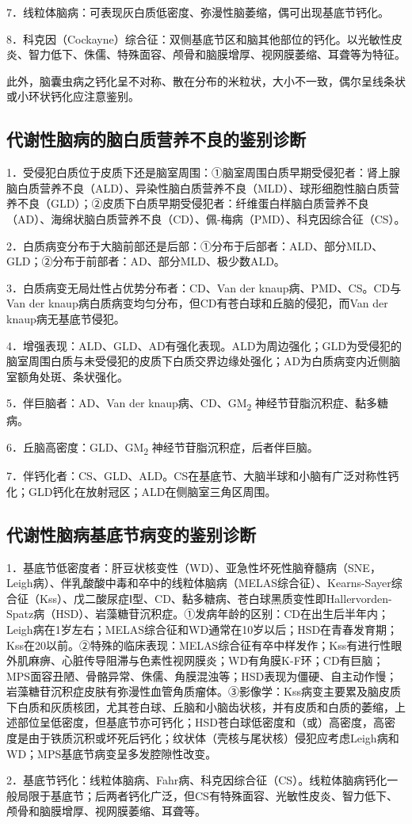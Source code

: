 7．线粒体脑病：可表现灰白质低密度、弥漫性脑萎缩，偶可出现基底节钙化。

8．科克因（Cockayne）综合征：双侧基底节区和脑其他部位的钙化。以光敏性皮炎、智力低下、侏儒、特殊面容、颅骨和脑膜增厚、视网膜萎缩、耳聋等为特征。

此外，脑囊虫病之钙化呈不对称、散在分布的米粒状，大小不一致，偶尔呈线条状或小环状钙化应注意鉴别。

\subsection{代谢性脑病的脑白质营养不良的鉴别诊断}

1．受侵犯白质位于皮质下还是脑室周围：①脑室周围白质早期受侵犯者：肾上腺脑白质营养不良（ALD）、异染性脑白质营养不良（MLD）、球形细胞性脑白质营养不良（GLD）；②皮质下白质早期受侵犯者：纤维蛋白样脑白质营养不良（AD）、海绵状脑白质营养不良（CD）、佩-梅病（PMD）、科克因综合征（CS）。

2．白质病变分布于大脑前部还是后部：①分布于后部者：ALD、部分MLD、GLD；②分布于前部者：AD、部分MLD、极少数ALD。

3．白质病变无局灶性占优势分布者：CD、Van der knaup病、PMD、CS。CD与Van
der knaup病白质病变均匀分布，但CD有苍白球和丘脑的侵犯，而Van der
knaup病无基底节侵犯。

4．增强表现：ALD、GLD、AD有强化表现。ALD为周边强化；GLD为受侵犯的脑室周围白质与未受侵犯的皮质下白质交界边缘处强化；AD为白质病变内近侧脑室额角处斑、条状强化。

5．伴巨脑者：AD、Van der knaup病、CD、GM\textsubscript{2}
神经节苷脂沉积症、黏多糖病。

6．丘脑高密度：GLD、GM\textsubscript{2} 神经节苷脂沉积症，后者伴巨脑。

7．伴钙化者：CS、GLD、ALD。CS在基底节、大脑半球和小脑有广泛对称性钙化；GLD钙化在放射冠区；ALD在侧脑室三角区周围。

\subsection{代谢性脑病基底节病变的鉴别诊断}

1．基底节低密度者：肝豆状核变性（WD）、亚急性坏死性脑脊髓病（SNE，Leigh病）、伴乳酸酸中毒和卒中的线粒体脑病（MELAS综合征）、Kearns-Sayer综合征（Kss）、戊二酸尿症Ⅰ型、CD、黏多糖病、苍白球黑质变性即Hallervorden-Spatz病（HSD）、岩藻糖苷沉积症。①发病年龄的区别：CD在出生后半年内；Leigh病在1岁左右；MELAS综合征和WD通常在10岁以后；HSD在青春发育期；Kss在20以前。②特殊的临床表现：MELAS综合征有卒中样发作；Kss有进行性眼外肌麻痹、心脏传导阻滞与色素性视网膜炎；WD有角膜K-F环；CD有巨脑；MPS面容丑陋、骨骼异常、侏儒、角膜混浊等；HSD表现为僵硬、自主动作慢；岩藻糖苷沉积症皮肤有弥漫性血管角质瘤体。③影像学：Kss病变主要累及脑皮质下白质和灰质核团，尤其苍白球、丘脑和小脑齿状核，并有皮质和白质的萎缩，上述部位呈低密度，但基底节亦可钙化；HSD苍白球低密度和（或）高密度，高密度是由于铁质沉积或坏死后钙化；纹状体（壳核与尾状核）侵犯应考虑Leigh病和WD；MPS基底节病变呈多发腔隙性改变。

2．基底节钙化：线粒体脑病、Fahr病、科克因综合征（CS）。线粒体脑病钙化一般局限于基底节；后两者钙化广泛，但CS有特殊面容、光敏性皮炎、智力低下、颅骨和脑膜增厚、视网膜萎缩、耳聋等。

\protect\hypertarget{text00010.html}{}{}

